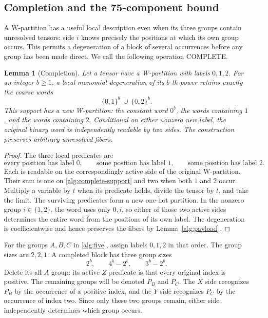 \documentclass[11pt]{article}
\numberwithin{equation}{section}
\newtheorem{lemma}[theorem]{Lemma}
\theoremstyle{definition}
\theoremstyle{remark}
\begin{document}
\subsection{Completion and the 75-component bound}
\label{alg:completion-section}

A W-partition has a useful local description even when its three groups
contain unresolved tensors: side \(i\) knows precisely the positions at
which its own group occurs.  This permits a degeneration of a block of
several occurrences before any group has been made direct.  We call the
following operation COMPLETE.

\begin{lemma}[Completion]
\label{alg:completion}
Let a tensor have a W-partition with labels \(0,1,2\).  For an integer
\(b\geq1\), a local monomial degeneration of its \(b\)-th power retains
exactly the coarse words
\begin{equation}
 \{0,1\}^b\ \cup\ \{0,2\}^b.
 \label{alg:complete-support}
\end{equation}
This support has a new W-partition: the constant word \(0^b\), the words
containing \(1\), and the words containing \(2\).  Conditional on either
nonzero new label, the original binary word is independently readable by
two sides.  The construction preserves arbitrary unresolved fibers.
\end{lemma}
\begin{proof}
The three local predicates are
\[
 \text{every position has label }0,\qquad
 \text{some position has label }1,\qquad
 \text{some position has label }2.
\]
Each is readable on the correspondingly active side of the original
W-partition.  Their sum is one on \eqref{alg:complete-support} and two
when both \(1\) and \(2\) occur.  Multiply a variable by \(t\) when its
predicate holds, divide the tensor by \(t\), and take the limit.  The
surviving predicates form a new one-hot partition.  In the nonzero group
\(i\in\{1,2\}\), the word uses only \(0,i\), so either of those two
active sides determines the entire word from the positions of its own
label.  The degeneration is coefficientwise and hence preserves the fibers
by Lemma~\ref{alg:payload}.
\end{proof}

For the groups \(A,B,C\) in \eqref{alg:five}, assign labels \(0,1,2\)
in that order.  The group sizes are \(2,2,1\).  A completed block has
three group sizes
\[
 2^b,\qquad4^b-2^b,\qquad3^b-2^b.
\]
Delete its all-\(A\) group: its active \(Z\) predicate is that every
original index is positive.  The remaining groups will be denoted
\(P_B\) and \(P_C\).  The \(X\) side recognizes \(P_B\) by the
occurrence of a positive index, and the \(Y\) side recognizes \(P_C\)
by the occurrence of index two.  Since only these two groups remain,
either side independently determines which group occurs.
\end{document}
